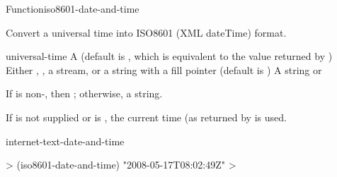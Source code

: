 \documentclass[10pt,twoside,english,pdftex]{article}
\begin{document}

\begin{functiondoc}{Function}{iso8601-date-and-time}{%
    }
% 

\fnsyntax

\fnpurpose Convert a universal time into ISO8601 (XML dateTime) format.

\fnpackage {}

\fnmodule {}

\fnargs
\begin{args}{universal-time}
 A  (default is \nil,
  which is equivalent to the value returned by
  )
\arg[destination] Either \nil, , a stream, or a string with a fill 
pointer (default is \nil)
\arg[result] A string or \nil{}
\end{args}

\fnreturns If  is non-\nil, then \nil; otherwise, a string.

\fndescription
{}%
%
If  is not supplied or is \nil, the current time
(as returned by  is used.

\begin{alsos}{internet-text-date-and-time}
\end{alsos}

\fnexample
%
\W\supp
\begin{example}
  > (iso8601-date-and-time)
  "2008-05-17T08:02:49Z"
  >
\end{example}

\end{functiondoc}

\end{document}
